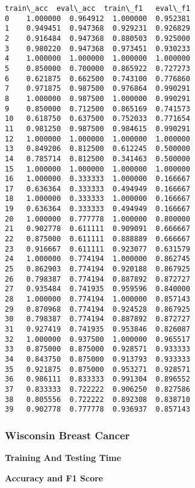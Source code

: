 \documentclass[11pt]{article}
\begin{document}
\begin{tcolorbox}[breakable, size=fbox, boxrule=.5pt, pad at break*=1mm, opacityfill=0]
\begin{Verbatim}[commandchars=\\\{\}]
    train\_acc  eval\_acc  train\_f1   eval\_f1
0    1.000000  0.964912  1.000000  0.952381
1    0.949451  0.947368  0.929231  0.926829
2    0.916484  0.947368  0.880503  0.925000
3    0.980220  0.947368  0.973451  0.930233
4    1.000000  1.000000  1.000000  1.000000
5    0.850000  0.700000  0.865922  0.727273
6    0.621875  0.662500  0.743100  0.776860
7    0.971875  0.987500  0.976864  0.990291
8    1.000000  0.987500  1.000000  0.990291
9    0.850000  0.712500  0.865169  0.741573
10   0.618750  0.637500  0.752033  0.771654
11   0.981250  0.987500  0.984615  0.990291
12   1.000000  1.000000  1.000000  1.000000
13   0.849206  0.812500  0.612245  0.500000
14   0.785714  0.812500  0.341463  0.500000
15   1.000000  1.000000  1.000000  1.000000
16   1.000000  0.333333  1.000000  0.166667
17   0.636364  0.333333  0.494949  0.166667
18   1.000000  0.333333  1.000000  0.166667
19   0.636364  0.333333  0.494949  0.166667
20   1.000000  0.777778  1.000000  0.800000
21   0.902778  0.611111  0.909091  0.666667
22   0.875000  0.611111  0.888889  0.666667
23   0.916667  0.611111  0.923077  0.631579
24   1.000000  0.774194  1.000000  0.862745
25   0.862903  0.774194  0.920188  0.867925
26   0.798387  0.774194  0.887892  0.872727
27   0.935484  0.741935  0.959596  0.840000
28   1.000000  0.774194  1.000000  0.857143
29   0.870968  0.774194  0.924528  0.867925
30   0.798387  0.774194  0.887892  0.872727
31   0.927419  0.741935  0.953846  0.826087
32   1.000000  0.937500  1.000000  0.965517
33   0.875000  0.875000  0.928571  0.933333
34   0.843750  0.875000  0.913793  0.933333
35   0.921875  0.875000  0.953271  0.928571
36   0.986111  0.833333  0.991304  0.896552
37   0.833333  0.722222  0.906250  0.827586
38   0.805556  0.722222  0.892308  0.838710
39   0.902778  0.777778  0.936937  0.857143
\end{Verbatim}
\end{tcolorbox}
        
    \hypertarget{wisconsin-breast-cancer}{%
\subsubsection{Wisconsin Breast Cancer}\label{wisconsin-breast-cancer}}

    \textbf{Training And Testing Time}

    

    \textbf{Accuracy and F1 Score}

    \begin{center}
    \end{center}
    { \hspace*{\fill} \\}
    
\end{document}
